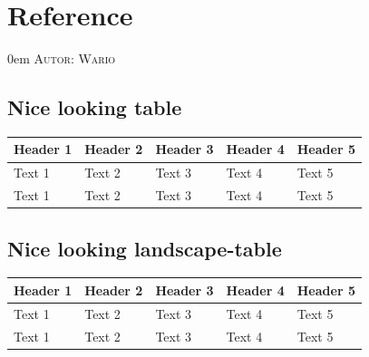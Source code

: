 \documentclass{article}
\makeatletter
\newcommand{\sectionauthor}[1]{
	{\parindent 0em \large \scshape Autor: #1 \par \nobreak \vspace*{1em}}
	\@afterheading
}
\makeatother
\begin{document}
\section{Reference}
\sectionauthor{Wario}

\subsection{Nice looking table}
\begin{longtable}{@{}lllll@{}}
\toprule
\textbf{Header 1} & \textbf{Header 2} & \textbf{Header 3} & \textbf{Header 4} & \textbf{Header 5} \\* \midrule
\endfirsthead
%
\endhead
%
Text 1            & Text 2            & Text 3            & Text 4            & Text 5            \\
Text 1            & Text 2            & Text 3            & Text 4            & Text 5            \\* \bottomrule
\end{longtable}

\subsection{Nice looking landscape-table}
\begin{landscape}
\begin{longtable}{@{}lllll@{}}
\toprule
\textbf{Header 1} & \textbf{Header 2} & \textbf{Header 3} & \textbf{Header 4} & \textbf{Header 5} \\* \midrule
\endfirsthead
%
\endhead
%
Text 1            & Text 2            & Text 3            & Text 4            & Text 5            \\
Text 1            & Text 2            & Text 3            & Text 4            & Text 5            \\* \bottomrule
\end{longtable}
\end{landscape}

\newpage
\end{document}
